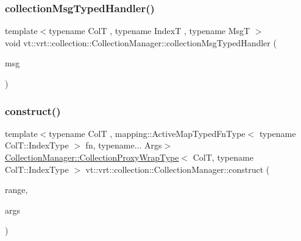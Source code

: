 \mbox{\label{structvt_1_1vrt_1_1collection_1_1_collection_manager_a7bb443544c8c4b94a7a10a0ec8126018}} 
\subsubsection{\texorpdfstring{collection\+Msg\+Typed\+Handler()}{collectionMsgTypedHandler()}}
{\footnotesize\ttfamily template$<$typename ColT , typename IndexT , typename MsgT $>$ \\
void vt\+::vrt\+::collection\+::\+Collection\+Manager\+::collection\+Msg\+Typed\+Handler (\begin{DoxyParamCaption}\item[{MsgT $\ast$}]{msg }\end{DoxyParamCaption})\hspace{0.3cm}{\ttfamily [static]}}

\mbox{\label{structvt_1_1vrt_1_1collection_1_1_collection_manager_a4de84e9efd7a3948e3c20be549441cfd}} 
\subsubsection{\texorpdfstring{construct()}{construct()}\hspace{0.1cm}{\footnotesize\ttfamily [1/2]}}
{\footnotesize\ttfamily template$<$typename ColT , mapping\+::\+Active\+Map\+Typed\+Fn\+Type$<$ typename Col\+T\+::\+Index\+Type $>$ fn, typename... Args$>$ \\
\hyperlink{structvt_1_1vrt_1_1collection_1_1_collection_manager_a56458ed7f9bb22b631b9b3a745f42f94}{Collection\+Manager\+::\+Collection\+Proxy\+Wrap\+Type}$<$ ColT, typename Col\+T\+::\+Index\+Type $>$ vt\+::vrt\+::collection\+::\+Collection\+Manager\+::construct (\begin{DoxyParamCaption}\item[{typename Col\+T\+::\+Index\+Type}]{range,  }\item[{Args \&\&...}]{args }\end{DoxyParamCaption})}

